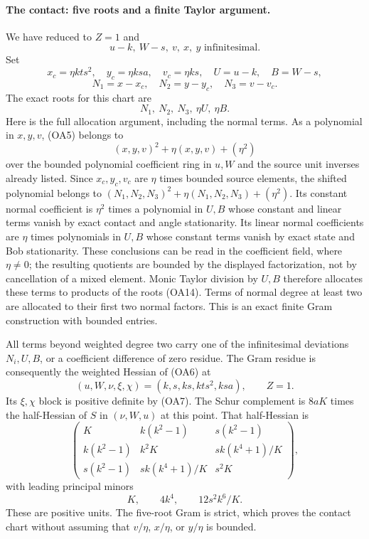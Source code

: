 \paragraph{The contact: five roots and a finite Taylor argument.}
We have reduced to $Z=1$ and
\[
 u-k,\ W-s,\ v,\ x,\ y\text{ infinitesimal}.
\]
Set
\[
 x_c=\eta kts^2,\quad y_c=\eta ksa,\quad v_c=\eta ks,
\quad U=u-k,\quad B=W-s,
\]
\[
 N_1=x-x_c,\quad N_2=y-y_c,\quad N_3=v-v_c.
\]
The exact roots for this chart are
\[
                 N_1,\ N_2,\ N_3,\ \eta U,\ \eta B.   \tag{OA14}
\]
Here is the full allocation argument, including the normal terms.
As a polynomial in $x,y,v$, (OA5) belongs to
\[
              (x,y,v)^2+\eta(x,y,v)+(\eta^2)
\]
over the bounded polynomial coefficient ring in $u,W$ and the source
unit inverses already listed. Since $x_c,y_c,v_c$ are $\eta$ times
bounded source elements, the shifted polynomial belongs to
$(N_1,N_2,N_3)^2+\eta(N_1,N_2,N_3)+(\eta^2)$.
Its constant normal coefficient is $\eta^2$ times a polynomial in
$U,B$ whose constant and linear terms vanish by exact contact and
angle stationarity. Its linear normal coefficients are $\eta$ times
polynomials in $U,B$ whose constant terms vanish by exact state and
Bob stationarity. These conclusions can be read in the coefficient
field, where $\eta\ne0$; the resulting quotients are bounded by the
displayed factorization, not by cancellation of a mixed element.
Monic Taylor division by $U,B$ therefore allocates these terms to
products of the roots (OA14). Terms of normal degree at least two
are allocated to their first two normal factors. This is an exact
finite Gram construction with bounded entries.

All terms beyond weighted degree two carry one of the infinitesimal
deviations $N_i,U,B$, or a coefficient difference of zero residue.
The Gram residue is consequently the weighted Hessian of (OA6) at
\[
 (u,W,\nu,\xi,\chi)=(k,s,ks,kts^2,ksa),\qquad Z=1.
\]
Its $\xi,\chi$ block is positive definite by (OA7).
The Schur complement is $8aK$ times the half-Hessian of $S$ in
$(\nu,W,u)$ at this point. That half-Hessian is
\[
 \begin{pmatrix}
 K&k(k^2-1)&s(k^2-1)\\
 k(k^2-1)&k^2K&sk(k^4+1)/K\\
 s(k^2-1)&sk(k^4+1)/K&s^2K
 \end{pmatrix},                                      \tag{OA15}
\]
with leading principal minors
\[
                    K,\qquad4k^4,\qquad12s^2k^6/K.
                                                        \tag{OA16}
\]
These are positive units. The five-root Gram is strict, which proves
the contact chart without assuming that $v/\eta$, $x/\eta$, or
$y/\eta$ is bounded.

